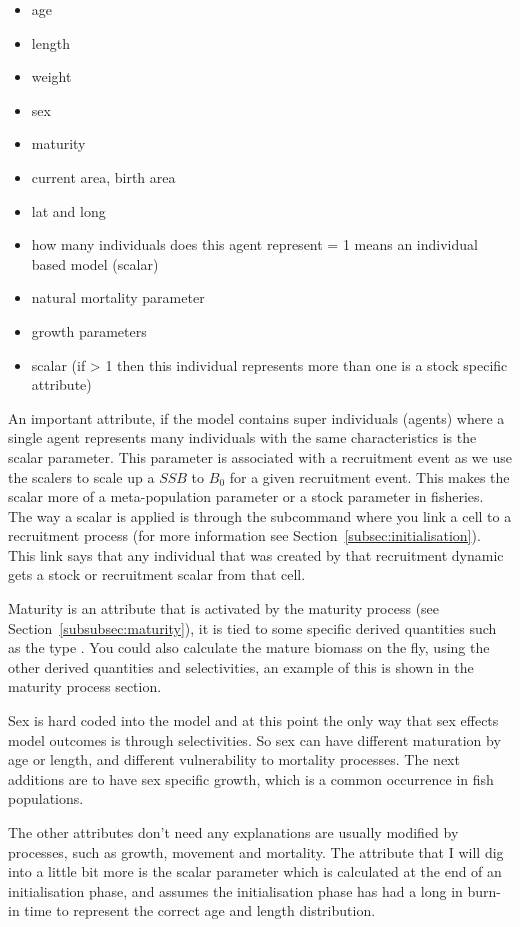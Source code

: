 \begin{itemize}
	\item age
	\item length
	\item weight
	\item sex
	\item maturity
	\item current area, birth area
	\item lat and long
	\item {} how many individuals does this agent represent = 1 means an individual based model (scalar)
	\item natural mortality parameter
	\item growth parameters
	\item scalar (if > 1 then this individual represents more than one is a stock specific attribute)
\end{itemize}

An important attribute, if the model contains super individuals (agents) where a single agent represents many individuals with the same characteristics is the scalar parameter. This parameter is associated with a recruitment event as we use the scalers to scale up a $SSB$ to $B_0$ for a given recruitment event. This makes the scalar more of a meta-population parameter or a stock parameter in fisheries. The way a scalar is applied is through the subcommand  where you link a cell to a recruitment process (for more information see Section~\ref{subsec:initialisation}). This link says that any individual that was created by that recruitment dynamic gets a stock or recruitment scalar from that cell.

Maturity is an attribute that is activated by the maturity process (see Section~\ref{subsubsec:maturity}), it is tied to some specific derived quantities such as the type . You could also calculate the mature biomass on the fly, using the other derived quantities and selectivities, an example of this is shown in the maturity process section.

Sex is hard coded into the model and at this point the only way that sex effects model outcomes is through selectivities. So sex can have different maturation by age or length, and different vulnerability to mortality processes. The next additions are to have sex specific growth, which is a common occurrence in fish populations.

The other attributes don't need any explanations are usually modified by processes, such as growth, movement and mortality. The attribute that I will dig into a little bit more is the scalar parameter which is calculated at the end of an initialisation phase, and assumes the initialisation phase has had a long in burn-in time to represent the correct age and length distribution.

